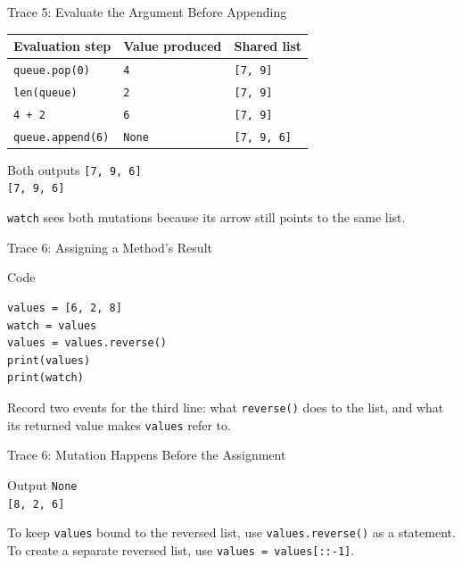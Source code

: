 \documentclass[aspectratio=169,10pt]{beamer}
\begin{document}
\begin{frame}{Trace 5: Evaluate the Argument Before Appending}
  \begin{center}
    \renewcommand{\arraystretch}{1.4}
    \begin{tabular}{l|l|l}
      \textbf{Evaluation step} & \textbf{Value produced} & \textbf{Shared list} \\\hline
      \texttt{queue.pop(0)} & \texttt{4} & \texttt{[7, 9]} \\
      \texttt{len(queue)} & \texttt{2} & \texttt{[7, 9]} \\
      \texttt{4 + 2} & \texttt{6} & \texttt{[7, 9]} \\
      \texttt{queue.append(6)} & \texttt{None} & \texttt{[7, 9, 6]}
    \end{tabular}
  \end{center}
  \begin{block}{Both outputs}
    \texttt{[7, 9, 6]}\\
    \texttt{[7, 9, 6]}
  \end{block}
  \texttt{watch} sees both mutations because its arrow still points to the same list.
\end{frame}

\begin{frame}[fragile]{Trace 6: Assigning a Method's Result}
  \begin{block}{Code}
\begin{verbatim}
values = [6, 2, 8]
watch = values
values = values.reverse()
print(values)
print(watch)
\end{verbatim}
  \end{block}
  \begin{activity}
    Record two events for the third line: what \texttt{reverse()} does to the list, and what its returned value makes \texttt{values} refer to.
  \end{activity}
\end{frame}

\begin{frame}{Trace 6: Mutation Happens Before the Assignment}
  \begin{center}
    \resizebox{0.90\linewidth}{!}{\nonereturndiagram}
  \end{center}
  \begin{block}{Output}
    \texttt{None}\\
    \texttt{[8, 2, 6]}
  \end{block}
  To keep \texttt{values} bound to the reversed list, use \texttt{values.reverse()} as a statement. To create a separate reversed list, use \texttt{values = values[::-1]}.
\end{frame}
\end{document}
